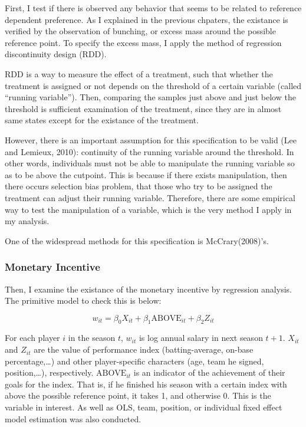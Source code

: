 \documentclass[dvipdfmx, 12pt]{article}
\begin{document}
  First, I test if there is observed any behavior that seems to be related to reference dependent preference. As I explained in the previous chpaters, the existance is verified by the observation of bunching, or excess mass around the possible reference point. To specify the excess mass, I apply the method of regression discontinuity design (RDD).

  RDD is a way to measure the effect of a treatment, such that whether the treatment is assigned or not depends on the threshold of a certain variable (called ``running variable''). Then, comparing the samples just above and just below the threshold is sufficient examination of the treatment, since they are in almost same states except for the existance of the treatment.

  However, there is an important assumption for this specification to be valid (Lee and Lemieux, 2010): continuity of the running variable around the threshold. In other words, individuals must not be able to manipulate the running variable so as to be above the cutpoint. This is because if there exists manipulation, then there occurs selection bias problem, that those who try to be assigned the treatment can adjust their running variable. Therefore, there are some empirical way to test the manipulation of a variable, which is the very method I apply in my analysis.

  One of the widespread methods for this specification is  McCrary(2008)'s.



  \subsubsection{Monetary Incentive}

  Then, I examine the existance of the monetary incentive by regression analysis. The primitive model to check this is below:

  \[
  w_{it} = \beta_0 X_{it} + \beta_1 \text{ABOVE}_{it}
  + \beta_2 Z_{it}
  \]

  For each player $i$ in the season $t$, $w_{it}$ is log annual salary in next season $t+1$. $X_{it}$ and $Z_{it}$ are the value of performance index (batting-average, on-base percentage,\ldots) and other player-specific characters (age, team he signed, position,\ldots), respectively. $\text{ABOVE}_{it}$ is an indicator of the achievement of their goals for the index. That is, if he finished his season with a certain index with above the possible reference point, it takes 1, and otherwise 0. This is the variable in interest. As well as OLS, team, position, or individual fixed effect model estimation was also conducted.
\end{document}
